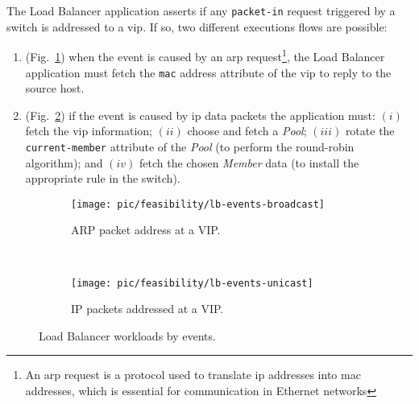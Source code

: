 The Load Balancer application asserts if any \texttt{packet-in} request triggered by a switch is addressed to a \gls{vip}. 
If so, two different executions flows are possible: 
\vspace{-10pt}
\begin{enumerate} 
\item (Fig.~\ref{fig:lb:interaction:arp2Vip})  when the event is caused by an \gls{arp} request\footnote{An \gls{arp} request is a protocol used to translate \gls{ip} addresses into \gls{mac} addresses, which is essential for communication in Ethernet networks}, the Load Balancer application must fetch the \texttt{mac} address attribute of the \gls{vip} to reply to the source host. 

\item (Fig.~\ref{fig:lb:interaction:ip2Vip})  if the event is caused by \gls{ip} data packets the application must: $(i)$ fetch the \gls{vip} information; $(ii)$ choose and fetch a \emph{Pool}; $(iii)$ rotate the \texttt{current-member} attribute of the \emph{Pool}  (to perform the round-robin algorithm); and $(iv)$  fetch the chosen  \emph{Member}  data (to install the appropriate rule in the switch).  
\end{enumerate}

\vspace{-25pt}
\begin{figure}[ht]
  \centering
  \begin{subfigure}[b]{0.5\textwidth}
                \centering
                \texttt{[image: pic/feasibility/lb-events-broadcast]}
                \caption{ARP packet address at a VIP.}
                \label{fig:lb:interaction:arp2Vip}
        \end{subfigure}%
        ~
        \begin{subfigure}[b]{0.5\textwidth}
                \centering
                \texttt{[image: pic/feasibility/lb-events-unicast]}
                \caption{IP packets addressed at a VIP. }
                \label{fig:lb:interaction:ip2Vip}
        \end{subfigure}
        \caption[Load Balancer workloads]{Load Balancer workloads by events.}  
        \label{fig:lb:interaction}
\vspace{-10pt}
\end{figure}


